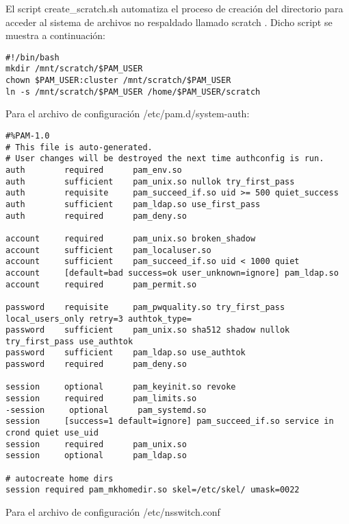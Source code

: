 El script create\_scratch.sh automatiza el proceso de creación del directorio para acceder al sistema de archivos no respaldado llamado scratch \cite{pamexec} \cite{pamexec2}. Dicho script se muestra a continuación:

\begin{lstlisting}
#!/bin/bash
mkdir /mnt/scratch/$PAM_USER
chown $PAM_USER:cluster /mnt/scratch/$PAM_USER
ln -s /mnt/scratch/$PAM_USER /home/$PAM_USER/scratch
\end{lstlisting}

Para el archivo de configuración /etc/pam.d/system-auth:
\begin{lstlisting} 
#%PAM-1.0
# This file is auto-generated.
# User changes will be destroyed the next time authconfig is run.
auth        required      pam_env.so
auth        sufficient    pam_unix.so nullok try_first_pass
auth        requisite     pam_succeed_if.so uid >= 500 quiet_success
auth        sufficient    pam_ldap.so use_first_pass
auth        required      pam_deny.so

account     required      pam_unix.so broken_shadow
account     sufficient    pam_localuser.so
account     sufficient    pam_succeed_if.so uid < 1000 quiet
account     [default=bad success=ok user_unknown=ignore] pam_ldap.so
account     required      pam_permit.so

password    requisite     pam_pwquality.so try_first_pass local_users_only retry=3 authtok_type=
password    sufficient    pam_unix.so sha512 shadow nullok try_first_pass use_authtok
password    sufficient    pam_ldap.so use_authtok
password    required      pam_deny.so

session     optional      pam_keyinit.so revoke
session     required      pam_limits.so
-session     optional      pam_systemd.so
session     [success=1 default=ignore] pam_succeed_if.so service in crond quiet use_uid
session     required      pam_unix.so
session     optional      pam_ldap.so

# autocreate home dirs
session required pam_mkhomedir.so skel=/etc/skel/ umask=0022
\end{lstlisting}
Para el archivo de configuración /etc/nsswitch.conf
